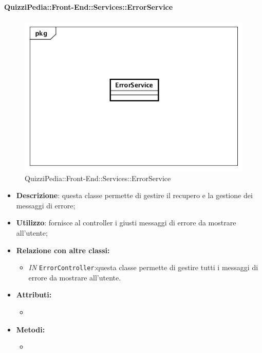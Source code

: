 \paragraph{QuizziPedia::Front-End::Services::ErrorService}
\begin{figure}
	\centering
	\includegraphics[scale=0.45]{UML/Classi/Front-End/QuizziPedia_Front-end_Services_ ErrorService.png}
	\caption{QuizziPedia::Front-End::Services::ErrorService}
\end{figure}
\begin{itemize}
	\item \textbf{Descrizione}: questa classe permette di gestire il recupero e la gestione dei messaggi di errore;
	\item \textbf{Utilizzo}: fornisce al controller i giusti messaggi di errore da mostrare all'utente;
	\item \textbf{Relazione con altre classi:}
	\begin{itemize}
		\item \textit{IN} \texttt{ErrorController}:questa classe permette di gestire tutti i messaggi di errore da mostrare all'utente. 
	\end{itemize}
	\item \textbf{Attributi:}
	\begin{itemize}
		\item 
	\end{itemize}
	\item \textbf{Metodi:}
	\begin{itemize}
		\item 
	\end{itemize}
\end{itemize}

